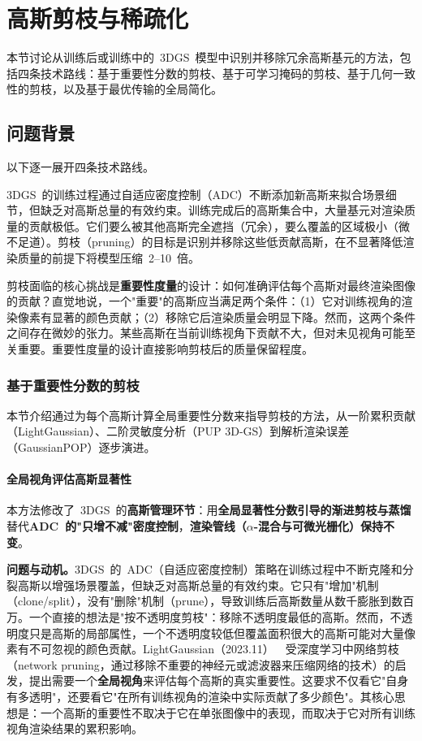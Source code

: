 \section{高斯剪枝与稀疏化}
\label{sec:11_1}

本节讨论从训练后或训练中的~3DGS~模型中识别并移除冗余高斯基元的方法，包括四条技术路线：基于重要性分数的剪枝、基于可学习掩码的剪枝、基于几何一致性的剪枝，以及基于最优传输的全局简化。

\subsection{问题背景}

以下逐一展开四条技术路线。

3DGS~的训练过程通过自适应密度控制（ADC）不断添加新高斯来拟合场景细节，但缺乏对高斯总量的有效约束。训练完成后的高斯集合中，大量基元对渲染质量的贡献极低。它们要么被其他高斯完全遮挡（冗余），要么覆盖的区域极小（微不足道）。剪枝（pruning）的目标是识别并移除这些低贡献高斯，在不显著降低渲染质量的前提下将模型压缩~2--10~倍。

剪枝面临的核心挑战是\textbf{重要性度量}的设计：如何准确评估每个高斯对最终渲染图像的贡献？直觉地说，一个"重要"的高斯应当满足两个条件：（1）它对训练视角的渲染像素有显著的颜色贡献；（2）移除它后渲染质量会明显下降。然而，这两个条件之间存在微妙的张力。某些高斯在当前训练视角下贡献不大，但对未见视角可能至关重要。重要性度量的设计直接影响剪枝后的质量保留程度。

\subsubsection{基于重要性分数的剪枝}

本节介绍通过为每个高斯计算全局重要性分数来指导剪枝的方法，从一阶累积贡献（LightGaussian）、二阶灵敏度分析（PUP 3D-GS）到解析渲染误差（GaussianPOP）逐步演进。

\paragraph{全局视角评估高斯显著性}

本方法修改了~3DGS~的\textbf{高斯管理环节}：用\textbf{全局显著性分数引导的渐进剪枝与蒸馏}替代\textbf{ADC~的"只增不减"密度控制}，\textbf{渲染管线（$\alpha$-混合与可微光栅化）保持不变}。

\textbf{问题与动机。}3DGS~的~ADC（自适应密度控制）策略在训练过程中不断克隆和分裂高斯以增强场景覆盖，但缺乏对高斯总量的有效约束。它只有"增加"机制（clone/split），没有"删除"机制（prune），导致训练后高斯数量从数千膨胀到数百万。一个直接的想法是"按不透明度剪枝"：移除不透明度最低的高斯。然而，不透明度只是高斯的局部属性，一个不透明度较低但覆盖面积很大的高斯可能对大量像素有不可忽视的颜色贡献。LightGaussian（2023.11）~\cite{2311_17245}~受深度学习中网络剪枝（network pruning，通过移除不重要的神经元或滤波器来压缩网络的技术）的启发，提出需要一个\textbf{全局视角}来评估每个高斯的真实重要性。这要求不仅看它"自身有多透明"，还要看它"在所有训练视角的渲染中实际贡献了多少颜色"。其核心思想是：一个高斯的重要性不取决于它在单张图像中的表现，而取决于它对所有训练视角渲染结果的累积影响。

